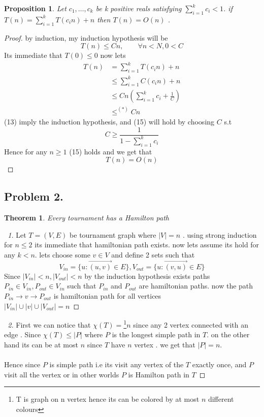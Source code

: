 \documentclass[12pt]{article}
\newtheorem*{theorem*}{Theorem}
\newtheorem{prop}{Proposition}
\begin{document}
\begin{prop}Let $c_1, \dots , c_k$ be k positive reals satisfying $\sum^k_{i=1} c_i < 1$. if $T(n) =\sum^k_{i=1} T(c_in) +n
$ then $T(n) = O(n)$ .\end{prop}
\begin{proof}by induction, my induction hypothesis will  be
$$T(n)\le Cn, \qquad \forall n < N,0<C$$
Its immediate that $T(0)\le 0$ now lets
\begin{align}
T(n) &= \sum^k_{i=1} T(c_in) +n\\
 &\le\sum^k_{i=1} C(c_in) +n\\
 &\le Cn\left(\sum^k_{i=1}c_i +\frac{1}{C}\right)\\
 &\le^{(*)} Cn
\end{align}
(13) imply the induction hypothesis, and (15) will hold by choosing $C$ s.t
\[C \ge \frac{1}{1-\sum^k_{i=1}c_i}
\]
Hence for any $n\ge 1$ (15) holds and we get that \[T(n)=O(n)
\]
\end{proof}
\subsection*{Problem 2.}
\begin{theorem*}
 Every tournament has a Hamilton path
\end{theorem*}
 \begin{proof}[\proofname\ 1]Let $T=(V,E)$ be tournament graph where $|V|=n$ . using strong induction for $n\leq 2$ its immediate that  hamiltonian path exists. now lets assume its hold for any $k<n$. lets choose some  $v\in V$ and define 2 sets such that
\[V_{in}=\{u: \overrightarrow{(u,v)}\in E\},V_{out}=\{u: \overrightarrow{(v,u)}\in E\}
\]
Since $|V_{in}|<n,|V_{out}|<n$ by the induction hypothesis exists paths \\$P_{in}\in V_{in},P_{out}\in V_{in}$ such that $P_{in}$ and $P_{out}$ are hamiltonian paths. now the path $P_{in}\rightarrow v \rightarrow P_{out}$ is hamiltonian path for all vertices \\$|V_{in}|\cup |v| \cup|V_{out}|=n$
\end{proof}

 \begin{proof}[\proofname\ 2] First we can notice that $\chi(T)=$\footnote{T is graph on n vertex hence its can be colored by   at most $n$ different colours}$n$ since any 2 vertex connected with an edge . Since $\chi(T)\leq |P|$ where $P$ is the longest simple path in $T$. on the other hand its can be at most $n$ since $T$  have $n$ vertex .  we get that $|P|=n$.\\\\ Hence since $P$ is simple path i.e its visit any vertex of the $T$ exactly once, and $P$ visit all the vertex or in other worlds $P$ is Hamilton path in $T$
\end{proof}
\pagebreak
\end{document}
